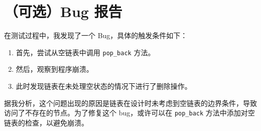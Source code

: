 \documentclass[UTF8]{ctexart}
\begin{document}
\section{（可选）Bug 报告}

在测试过程中，我发现了一个 Bug，具体的触发条件如下：

\begin{enumerate}[label=\arabic*.]
    \item 首先，尝试从空链表中调用 \texttt{pop\_back} 方法。
    \item 然后，观察到程序崩溃。
    \item 此时发现链表在未处理空状态的情况下进行了删除操作。
\end{enumerate}

据我分析，这个问题出现的原因是链表在设计时未考虑到空链表的边界条件，导致访问了不存在的节点。为了修复这个 bug，或许可以在 \texttt{pop\_back} 方法中添加对空链表的检查，以避免崩溃。
\end{document}

